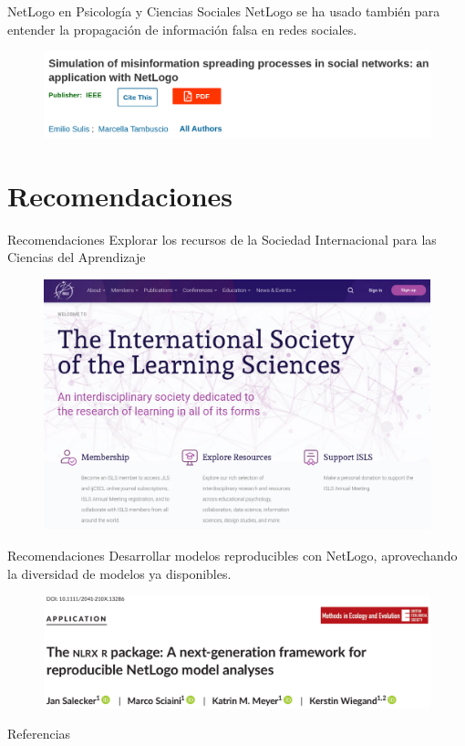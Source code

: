 \documentclass{beamer}
\begin{document}
\begin{frame}{NetLogo en Psicología y Ciencias Sociales}
NetLogo se ha usado también para entender la propagación de información falsa en redes sociales.
\begin{figure}
\centering
\includegraphics[width=.85\textwidth]{misinfo.png}
\end{figure}  
\cite{Sulis2020}
\end{frame}

\section{Recomendaciones}
\begin{frame}{Recomendaciones}
Explorar los recursos de la Sociedad Internacional para las Ciencias del Aprendizaje
\begin{figure}
\centering
\includegraphics[width=.85\textwidth]{ISLS.png}
\end{figure}     
\end{frame}

\begin{frame}{Recomendaciones}
Desarrollar modelos reproducibles con NetLogo, aprovechando la diversidad de modelos ya disponibles.
\begin{figure}
\centering
\includegraphics[width=.85\textwidth]{nlrx.png}
\end{figure}     
\cite{Salecker2019}    
\end{frame}



\begin{frame}[allowframebreaks]{Referencias}
\tiny{ 


}
\end{frame}
\end{document}
